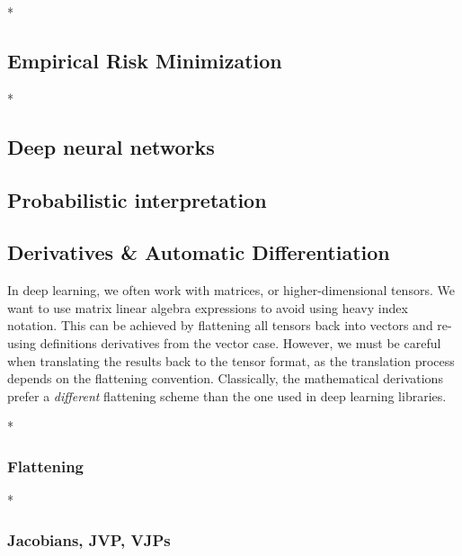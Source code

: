 \switchcolumn[1]*
\switchcolumn[0]

\subsection{Empirical Risk Minimization}


\switchcolumn[1]*
\switchcolumn[0]

\subsection{Deep neural networks}


\subsection{Probabilistic interpretation}


\subsection{Derivatives \& Automatic Differentiation}

\begin{caveat}
  In deep learning, we often work with matrices, or higher-dimensional tensors.
  We want to use matrix linear algebra expressions to avoid using heavy index notation.
  This can be achieved by flattening all tensors back into vectors and re-using definitions derivatives from the vector case.
  However, we must be careful when translating the results back to the tensor format, as the translation process depends on the flattening convention.
  Classically, the mathematical derivations prefer a \emph{different} flattening scheme than the one used in deep learning libraries.
\end{caveat}

\switchcolumn[0]*
\subsubsection{Flattening}


\switchcolumn[0]*
\subsubsection{Jacobians, JVP, VJPs}


